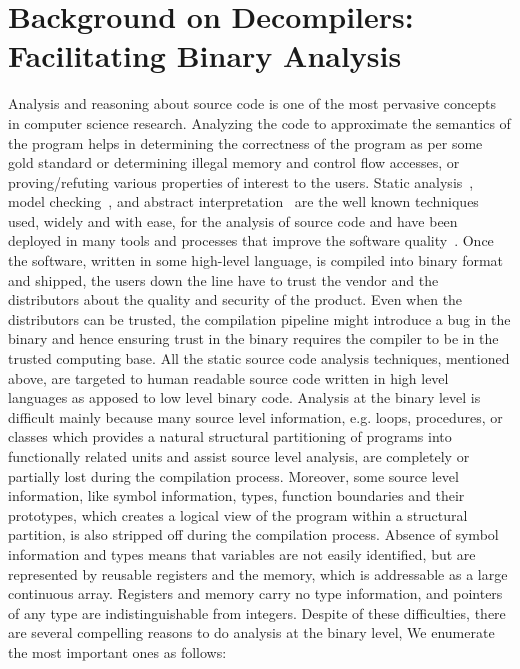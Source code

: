 \chapter{Background on Decompilers: Facilitating Binary Analysis}\label{sec:decompilers}

Analysis and reasoning about source code is one of the most pervasive concepts
in computer science research. Analyzing the code to approximate  the semantics
of the program helps in determining the correctness of the program as per some
gold standard or determining illegal memory and control flow accesses, or
proving/refuting various properties of interest to the users. Static
analysis~\cite{Nielson2010}, model checking~\cite{Clarke1981,Queille1982}, and
abstract interpretation~\cite{Cousot1977} are the well known techniques used,
widely and with ease, for the  analysis of source code and have been
deployed in many tools and processes that improve the software
quality~\cite{Xie:2003,Musuvathi:2008,Ivancic:2005,Dwyer:2007,Binkley:2007,Bessey2010,Ball2006}.
Once the software, written in some high-level language, is compiled
into binary format and shipped, the users down the line have to trust
the vendor and the distributors about the quality and security of the
product. Even when the distributors can be trusted, the compilation
pipeline might introduce a bug in the binary and hence ensuring trust
in the binary requires the compiler to be in the trusted computing
base.  All the static source code analysis techniques, mentioned
above, are targeted to human readable source code written in high
level languages as apposed to low level binary code. Analysis at the
binary level is difficult mainly because many source level
information, e.g. loops, procedures, or classes which provides a
natural structural partitioning of programs into functionally related
units and assist source level analysis, are completely or partially
lost during the compilation process. Moreover, some source level
information, like symbol information, types, function boundaries and
their prototypes, which creates a logical view of the program  within
a structural partition, is also stripped off during the compilation
process. Absence of symbol information and types means that variables
are not easily identified, but are represented by reusable registers
and the memory, which is addressable as a large continuous array.
Registers and memory carry no type information, and pointers of any
type are indistinguishable from integers.  Despite of these
difficulties, there are several compelling reasons to do analysis at
the binary level, We enumerate the most important ones as follows:

